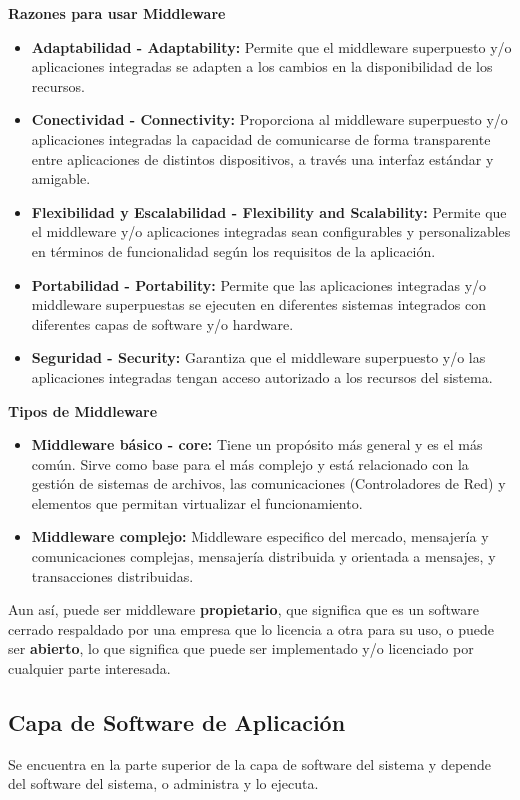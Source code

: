 \documentclass[12pt, twoside, openright]{report} %
\begin{document}
\textbf{Razones para usar Middleware}
\begin{itemize}
	\item \textbf{Adaptabilidad - Adaptability:} Permite que el middleware superpuesto y/o aplicaciones integradas se adapten a los cambios en la disponibilidad de los recursos.
	\item \textbf{Conectividad - Connectivity:} Proporciona al middleware superpuesto y/o aplicaciones integradas la capacidad de comunicarse de forma transparente entre aplicaciones de distintos dispositivos, a través una interfaz estándar y amigable.
	\item \textbf{Flexibilidad y Escalabilidad - Flexibility and Scalability:} Permite que el middleware y/o aplicaciones integradas sean configurables y personalizables en términos de funcionalidad según los requisitos de la aplicación.
	\item \textbf{Portabilidad - Portability:} Permite que las aplicaciones integradas y/o middleware superpuestas se ejecuten en diferentes sistemas integrados con diferentes capas de software y/o hardware.
	\item \textbf{Seguridad - Security:} Garantiza que el middleware superpuesto y/o las aplicaciones integradas tengan acceso autorizado a los recursos del sistema.
\end{itemize}

\textbf{Tipos de Middleware}
\begin{itemize}
	\item \textbf{Middleware básico - core:} Tiene un propósito más general y es el más común. Sirve como base para el más complejo y está relacionado con la gestión de sistemas de archivos, las comunicaciones (Controladores de Red) y elementos que permitan virtualizar el funcionamiento.
	\item \textbf{Middleware complejo:} Middleware especifico del mercado, mensajería y comunicaciones complejas, mensajería distribuida y orientada a mensajes, y transacciones distribuidas.
\end{itemize}

Aun así, puede ser middleware \textbf{propietario}, que significa que es un software cerrado respaldado por una empresa que lo licencia a otra para su uso, o puede ser \textbf{abierto}, lo que significa que puede ser implementado y/o licenciado por cualquier parte interesada.

\subsection{Capa de Software de Aplicación}
Se encuentra en la parte superior de la capa de software del sistema y depende del software del sistema, o administra y lo ejecuta.
\end{document}
